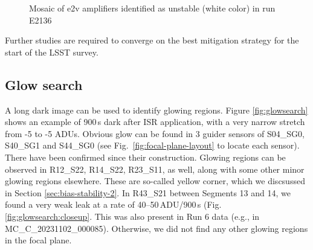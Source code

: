 \begin{figure}[htbp]
\begin{minipage}{0.45\textwidth}
    \caption{Mosaic of e2v amplifiers identified as unstable (white color) in run E2136}
    \label{fig:stability_mosaic}
\end{minipage}
\end{figure}

%

Further studies are required to converge on the best mitigation
strategy for the start of the LSST survey.
\clearpage
\subsection{Glow search}
A long dark image can be used to identify glowing regions. Figure \ref{fig:glowsearch} shows an example of 900\,s dark after ISR application, with a very narrow stretch from -5 to -5 ADUs. 
Obvious glow can be found in 3 guider sensors of S04\_SG0, S40\_SG1 and S44\_SG0 (see Fig.~\ref{fig:focal-plane-layout} to locate each sensor). There have been confirmed since their construction.
Glowing regions can be observed in R12\_S22, R14\_S22, R23\_S11, as well, along with some other minor glowing regions elsewhere. These are so-called yellow corner, which we discsussed in Section \ref{sec:bias-stability-2}.
In R43\_S21 between Segments 13 and 14, we found a very weak leak at a rate of 40--50\,ADU/900\,s (Fig. \ref{fig:glowsearch:closeup}. This was also present in Run 6 data (e.g., in MC\_C\_20231102\_000085).
Otherwise, we did not find any other glowing regions in the focal plane.

